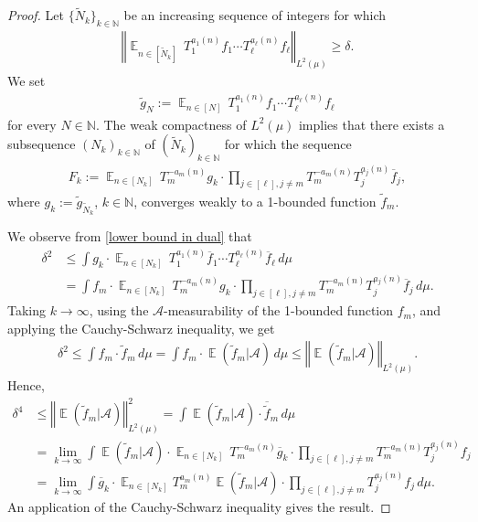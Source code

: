 \documentclass[11pt]{amsart}
\theoremstyle{definition}
\newcommand{\N}{{\mathbb N}}
\newcommand{\CA}{{\mathcal A}}
\newcommand{\norm}[1]{\left\Vert #1\right\Vert}
\DeclareMathOperator*{\E}{\mathbb{E}}
\begin{document}
\begin{proof}
Let $\{\tilde{N}_k\}_{k\in\N}$ be an increasing sequence of integers for which
\begin{align}\label{lower bound in dual}
    \norm{\E_{n\in [\tilde{N}_k]} \, T_1^{a_1(n)}f_1\cdots T_\ell^{a_\ell(n)}f_\ell}_{L^2(\mu)}\geq \delta.
\end{align}
We set
\begin{align*}
    \tilde{g}_N := \E_{n\in [N]} \, T_1^{a_1(n)}{f_1}\cdots T_\ell^{a_\ell(n)}{f_\ell}
\end{align*}
for every $N\in\N$.
 The weak compactness of $L^2(\mu)$ implies  that there exists a subsequence $(N_k)_{k\in\N}$ of $(\tilde{N}_k)_{k\in\N}$ for which the sequence
\begin{align*}
    F_k:=\E_{n\in [N_k]}
	 \, T_m^{-a_m(n)}g_k\cdot \prod_{j\in [\ell], j\neq m}T_m^{-a_m(n)} T_j^{a_j(n)}\overline{f}_j,
\end{align*}
where $g_k := \tilde{g}_{\tilde{N}_k}$, $k\in\N$,  converges weakly to a 1-bounded function $\tilde{f}_m$.

We observe from \eqref{lower bound in dual} that
\begin{align*}
    \delta^2 &\leq \int {g_k} \cdot \E_{n\in [{N}_k]} \, T_1^{a_1(n)}\overline{f}_1\cdots T_\ell^{a_\ell(n)}\overline{f}_\ell\, d\mu\\
    &= \int {f}_m \cdot \E_{n\in [{N}_k]} \, T_m^{-a_m(n)} g_k \cdot  \prod_{j\in [\ell], j\neq m}T_m^{-a_m(n)} T_j^{a_j(n)}\overline{f}_j\, d\mu.
\end{align*}
Taking $k\to\infty$, using the $\CA$-measurability of the 1-bounded function  $f_m$, and applying the Cauchy-Schwarz inequality, we get
\begin{align*}
    \delta^2 \leq \int f_m \cdot \tilde{f}_m\, d\mu = \int f_m \cdot \E(\tilde{f}_m|\CA)\, d\mu \leq \norm{\E(\tilde{f}_m|\CA)}_{L^2(\mu)}.
\end{align*}
Hence,
\begin{align*}
    \delta^4 &\leq \norm{\E(\tilde{f}_m|\CA)}_{L^2(\mu)}^2 = \int \E(\tilde{f}_m|\CA) \cdot \overline{\tilde{f}}_m\, d\mu\\
    &= \lim_{k\to\infty}\int \E(\tilde{f}_m|\CA) \cdot \E_{n\in [N_k]}
	 \, T_m^{-a_m(n)}\overline{g}_k\cdot \prod_{j\in [\ell], j\neq m}T_m^{-a_m(n)} T_j^{a_j(n)}{f}_j\\
	 &= \lim_{k\to\infty}\int  \overline{g}_k \cdot \E_{n\in [N_k]} T_m^{a_m(n)}\E(\tilde{f}_m|\CA)
	 \cdot \prod_{j\in [\ell], j\neq m}T_j^{a_j(n)}{f}_j\, d\mu.
\end{align*}
An application of the Cauchy-Schwarz inequality gives the result.
\end{proof}
\end{document}
